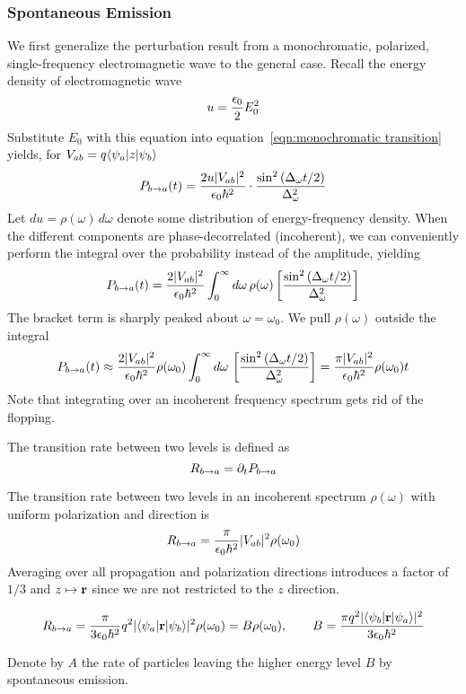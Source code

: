 \subsubsection{Spontaneous Emission}
We first generalize the perturbation result from a monochromatic, polarized, 
single-frequency electromagnetic wave to the general case. 
Recall the energy density of electromagnetic wave
\[
    u = \dfrac {\epsilon_0}{2}E_0^2
\]
Substitute $E_0$ with this equation into equation~\ref{eqn:monochromatic transition} 
yields, for $V_{ab} = q\langle \psi_a|z|\psi_b\rangle$ 
\[ 
    P_{b\to a}(t) = \dfrac{2u|V_{ab}|^2}{\epsilon_0 \hbar^2} \cdot 
        \dfrac{\sin^2\left(\Delta_\omega t/2\right)}{\Delta_\omega^2}
\] 
Let $du=\rho(\omega)\, d\omega$ denote some distribution of energy-frequency density. 
When the different components are phase-decorrelated (incoherent), we 
can conveniently perform the integral over the probability instead of the amplitude, yielding 
\[ 
    P_{b\to a}(t) = \dfrac{2|V_{ab}|^2}{\epsilon_0 \hbar^2} 
        \int_0^\infty d\omega\, \rho(\omega)\left[\dfrac{\sin^2\left(\Delta_\omega t/2\right)}{\Delta_\omega^2}\right]
\] 
The bracket term is sharply peaked about $\omega = \omega_0$. 
We pull $\rho(\omega)$ outside the integral 
\[ 
    P_{b\to a}(t) \approx \dfrac{2|V_{ab}|^2}{\epsilon_0 \hbar^2} \rho(\omega_0)
    \int_0^\infty d\omega\, \left[\dfrac{\sin^2\left(\Delta_\omega t/2\right)}{\Delta_\omega^2}\right]
    =\dfrac{\pi |V_{ab}|^2}{\epsilon_0 \hbar^2}\rho(\omega_0)t
\] 
Note that integrating over an incoherent frequency spectrum gets rid of the flopping. 
\begin{definition}
    The transition rate between two levels is defined as 
    \[ 
        R_{b\to a} = \partial_{t} P_{b\to a}
    \] 
\end{definition}
The transition rate between two levels in an incoherent spectrum $\rho(\omega)$ with 
uniform polarization and direction is 
\[ 
    R_{b\to a} = \dfrac{\pi}{\epsilon_0\hbar^2}|V_{ab}|^2 \rho(\omega_0)
\] 
Averaging over all propagation and polarization directions introduces a 
factor of $1/3$ and $z\mapsto \mathbf r$ since we are not restricted to the $z$ direction. 
\begin{mdframed}
\[ 
    R_{b\to a} = \dfrac{\pi}{3\epsilon_0\hbar^2}q^2|\langle \psi_a|\mathbf r|\psi_b\rangle|^2 \rho(\omega_0) 
    = B\rho(\omega_0),\quad\quad B = \dfrac{\pi q^2|\langle \psi_b|\mathbf r|\psi_a\rangle|^2}{3\epsilon_0\hbar^2}
\] 
\end{mdframed}
Denote by $A$ the rate of particles leaving the higher energy level $B$ by spontaneous emission. 
